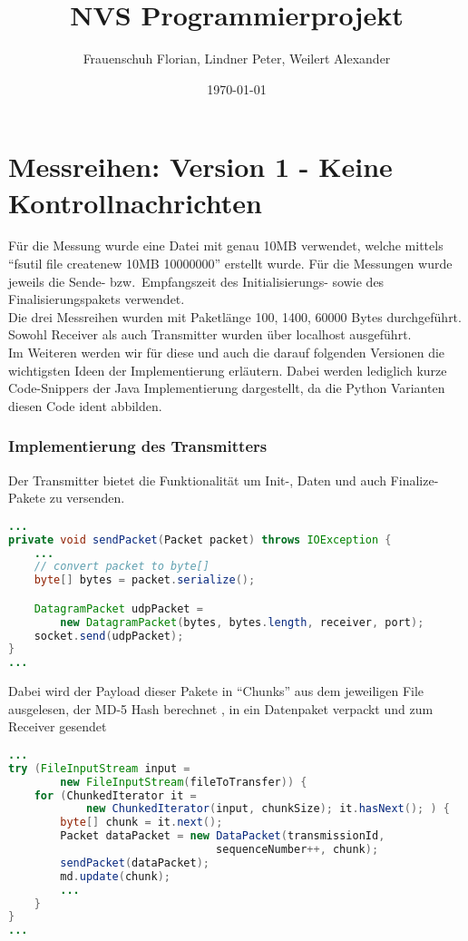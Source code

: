 \documentclass{article}
\title{NVS Programmierprojekt}
\author{Frauenschuh Florian, Lindner Peter, Weilert Alexander}
\date{\today}
\begin{document}
    \maketitle

    \section{Messreihen: Version 1 - Keine Kontrollnachrichten}
    Für die Messung wurde eine Datei mit genau 10MB verwendet, welche mittels \enquote{fsutil file createnew 10MB 10000000} erstellt wurde.
    Für die Messungen wurde jeweils die Sende- bzw.\ Empfangszeit des Initialisierungs- sowie des Finalisierungspakets verwendet. \\
    Die drei Messreihen wurden mit Paketlänge 100, 1400, 60000 Bytes durchgeführt. \\
    Sowohl Receiver als auch Transmitter wurden über localhost ausgeführt.\\

    Im Weiteren werden wir für diese und auch die darauf folgenden Versionen die wichtigsten Ideen der Implementierung
    erläutern.
    Dabei werden lediglich kurze Code-Snippers der Java Implementierung dargestellt, da die Python Varianten diesen
    Code ident abbilden.

    \subsubsection*{Implementierung des Transmitters}
    Der Transmitter bietet die Funktionalität um Init-, Daten und auch Finalize-Pakete zu versenden.\\

    \begin{lstlisting}[language=Java]
...
private void sendPacket(Packet packet) throws IOException {
    ...
    // convert packet to byte[]
    byte[] bytes = packet.serialize();

    DatagramPacket udpPacket =
        new DatagramPacket(bytes, bytes.length, receiver, port);
    socket.send(udpPacket);
}
...
    \end{lstlisting}

    Dabei wird der Payload dieser Pakete in \enquote{Chunks} aus dem jeweiligen File ausgelesen, der MD-5 Hash berechnet
    , in ein Datenpaket verpackt und zum Receiver gesendet

    \begin{lstlisting}[language=Java]
...
try (FileInputStream input =
        new FileInputStream(fileToTransfer)) {
    for (ChunkedIterator it =
            new ChunkedIterator(input, chunkSize); it.hasNext(); ) {
        byte[] chunk = it.next();
        Packet dataPacket = new DataPacket(transmissionId,
                                sequenceNumber++, chunk);
        sendPacket(dataPacket);
        md.update(chunk);
        ...
    }
}
...
    \end{lstlisting}
\end{document}
